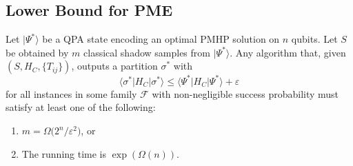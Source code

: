 \documentclass[11pt]{article}
\begin{document}
\subsection{Lower Bound for PME}

\begin{theorem}
\label{thm:shadow-barrier}
Let $|\Psi^*\rangle$ be a QPA state encoding an optimal PMHP solution on $n$ qubits. Let $S$ be obtained by $m$ classical shadow samples from $|\Psi^*\rangle$. Any algorithm that, given $(S,H_C,\{T_{ij}\})$, outputs a partition $\sigma^*$ with
\[
  \langle \sigma^*|H_C|\sigma^*\rangle \le \langle \Psi^*|H_C|\Psi^*\rangle + \varepsilon
\]
for all instances in some family $\mathcal{F}$ with non-negligible success probability must satisfy at least one of the following:
\begin{enumerate}
  \item $m = \Omega\bigl(2^n/\varepsilon^2\bigr)$, or
  \item The running time is $\exp(\Omega(n))$.
\end{enumerate}
\end{theorem}
\end{document}
